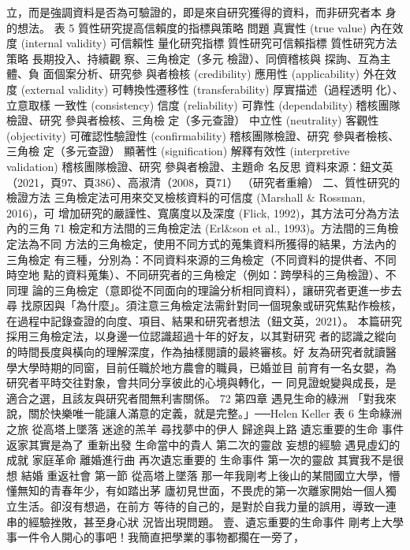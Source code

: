 立，而是強調資料是否為可驗證的，即是來自研究獲得的資料，而非研究者本
身的想法。 
表 5  
質性研究提高信賴度的指標與策略 
問題 
真實性 
(true value) 
內在效度 
(internal validity) 
可信賴性 
量化研究指標 質性研究可信賴指標 質性研究方法策略 
長期投入、持續觀
察、三角檢定（多元
檢證）、同儕稽核與
探詢、互為主體、負
面個案分析、研究參
與者檢核 
(credibility) 
應用性 
(applicability) 
外在效度 
(external 
validity) 
可轉換性∕遷移性 
(transferability) 
厚實描述（過程透明
化）、立意取樣 
一致性 
(consistency) 
信度 
(reliability) 
可靠性 
(dependability) 
稽核團隊檢證、研究
參與者檢核、三角檢
定（多元查證） 
中立性
(neutrality) 
客觀性 
(objectivity) 
可確認性∕驗證性 
(confirmability) 
稽核團隊檢證、研究
參與者檢核、三角檢
定（多元查證） 
顯著性 
(signification) 
解釋有效性 
(interpretive 
validation) 
稽核團隊檢證、研究
參與者檢證、主題命
名反思 
資料來源：鈕文英（2021，頁97、頁386）、高淑清（2008，頁71） 
（研究者重繪） 
二、質性研究的檢證方法 
三角檢定法可用來交叉檢核資料的可信度 (Marshall & Rossman, 2016)，可
增加研究的嚴謹性、寬廣度以及深度 (Flick, 1992)，其方法可分為方法內的三角
71 
檢定和方法間的三角檢定法 (Erl&son et al., 1993)。方法間的三角檢定法為不同
方法的三角檢定，使用不同方式的蒐集資料所獲得的結果，方法內的三角檢定
有三種，分別為：不同資料來源的三角檢定（不同資料的提供者、不同時空地
點的資料蒐集）、不同研究者的三角檢定（例如：跨學科的三角檢證）、不同理
論的三角檢定（意即從不同面向的理論分析相同資料），讓研究者更進一步去尋
找原因與「為什麼」。須注意三角檢定法需針對同一個現象或研究焦點作檢核，
在過程中記錄查證的向度、項目、結果和研究者想法（鈕文英，2021）。 
本篇研究採用三角檢定法，以身邊一位認識超過十年的好友，以其對研究
者的認識之縱向的時間長度與橫向的理解深度，作為抽樣閱讀的最終審核。好
友為研究者就讀醫學大學時期的同窗，目前任職於地方農會的職員，已婚並目
前育有一名女嬰，為研究者平時交往對象，會共同分享彼此的心境與轉化，一
同見證蛻變與成長，是適合之選，且該友與研究者間無利害關係。 
72 
第四章 遇見生命的綠洲 
「對我來說，關於快樂唯一能讓人滿意的定義，就是完整。」──Helen 
Keller 
表 6  
生命綠洲之旅 
從高塔上墜落 
迷途的羔羊 尋找夢中的伊人 歸途與上路 
遺忘重要的生命
事件 
返家其實是為了
重新出發 
生命當中的貴人 第二次的靈啟 
妄想的經驗 
遇見虛幻的成就 家庭革命 
離婚進行曲 
再次遺忘重要的
生命事件 
第一次的靈啟 其實我不是很想
結婚 
重返社會 
第一節 從高塔上墜落 
那一年我剛考上後山的某間國立大學，懵懂無知的青春年少，有如踏出茅
廬初見世面，不畏虎的第一次離家開始一個人獨立生活。卻沒有想過，在前方
等待的自己的，是對於自我力量的誤用，導致一連串的經驗挫敗，甚至身心狀
況皆出現問題。 
壹、遺忘重要的生命事件 
剛考上大學事一件令人開心的事吧！我簡直把學業的事物都擱在一旁了，
